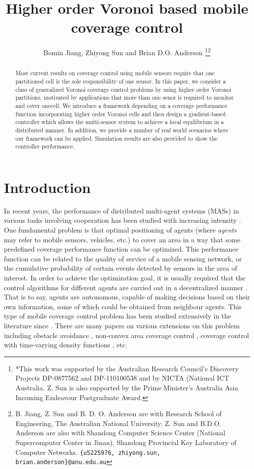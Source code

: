 \documentclass[letterpaper, 10 pt, conference]{ieeeconf}
\title{Higher order Voronoi based mobile coverage control}
\author{Bomin Jiang, Zhiyong Sun  and Brian D.O. Anderson \thanks{*This work  was supported by the Australian Research Council's Discovery Projects DP-0877562 and DP-110100538 and by NICTA (National ICT Australia. Z. Sun is also supported by the Prime Minister's Australia Asia Incoming Endeavour Postgraduate Award.}\thanks{ B. Jiang, Z. Sun and B. D. O. Anderson are with Research School of Engineering, The Australian National University. Z. Sun and B.D.O. Anderson are also with Shandong Computer Science Center (National Supercomputer Center in Jinan), Shandong Provincial Key Laboratory of Computer Networks.
        {\tt\small \{u5225976, zhiyong.sun, brian.anderson\}@anu.edu.au}}}
\begin{document}
\maketitle

\begin{abstract}
Most current results on coverage control using mobile sensors require that one partitioned cell is the sole responsibility of one sensor. In this paper, we consider a class of generalized Voronoi coverage control problems by using higher order Voronoi partitions, motivated by  applications that more than one senor is required to monitor and cover onecell. We introduce a framework depending on a coverage performance function incorporating higher order Voronoi cells and then design a gradient-based controller which allows the multi-sensor system to achieve a local equilibrium in a distributed manner. In addition, we provide a number of real world scenarios where our framework can be applied. Simulation results are also provided to show the controller performance.
\end{abstract}

\section{Introduction}

In recent years, the performance of distributed multi-agent systems (MASs) in various tasks involving cooperation has been studied with increasing intensity \cite{cao2013overview}. One fundamental problem is that optimal positioning of agents (where \emph{agents} may refer to mobile sensors, vehicles, etc.) to cover an area in a way that some predefined coverage performance function can be optimized. This performance function  can be related to the quality of service of a mobile sensing network, or the cumulative probability of certain events  detected by sensors in the area of interest.
In order to achieve the optimization goal, it is usually required that the control algorithms for different agents are carried out in a decentralized manner \cite{li2005distributed}. That is to say, agents are autonomous, capable of making decisions based on their own information, some of which could be obtained from neighbour agents.
This type of mobile coverage control problem has been studied extensively in the literature since \cite{cortes2004coverage}.
There are many papers on various extensions on this problem including obstacle avoidance \cite{lindhe2005flocking}, non-convex area coverage control \cite{breitenmoser2010voronoi}, coverage control with time-varying density functions \cite{lee2013controlled}, etc.
\end{document}
